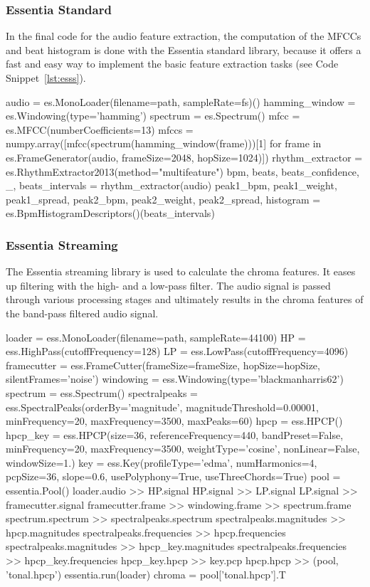 \subsubsection{Essentia Standard}

In the final code for the audio feature extraction, the computation of the MFCCs and beat histogram is done with the Essentia standard library, because it offers a fast and easy way to implement the basic feature extraction tasks (see Code Snippet~\ref{lst:esss}). 
\begin{pythonCode}[frame=single,label={lst:esss},caption={Essentia standard},captionpos=b]
audio = es.MonoLoader(filename=path, sampleRate=fs)()
hamming_window = es.Windowing(type='hamming')
spectrum = es.Spectrum()
mfcc = es.MFCC(numberCoefficients=13)
mfccs = numpy.array([mfcc(spectrum(hamming_window(frame)))[1] 
	for frame in es.FrameGenerator(audio, frameSize=2048, hopSize=1024)])
rhythm_extractor = es.RhythmExtractor2013(method="multifeature")
bpm, beats, beats_confidence, _, beats_intervals = rhythm_extractor(audio)
peak1_bpm, peak1_weight, peak1_spread, peak2_bpm, peak2_weight, peak2_spread, histogram =
	es.BpmHistogramDescriptors()(beats_intervals)
\end{pythonCode}

\subsubsection{Essentia Streaming}

The Essentia streaming library is used to calculate the chroma features. It eases up filtering with the high- and a low-pass filter. The audio signal is passed through various processing stages and ultimately results in the chroma features of the band-pass filtered audio signal. 
\begin{pythonCode}[frame=single,label={lst:essst},caption={Essentia streaming},captionpos=b]
loader = ess.MonoLoader(filename=path, sampleRate=44100)
HP = ess.HighPass(cutoffFrequency=128)
LP = ess.LowPass(cutoffFrequency=4096)
framecutter = ess.FrameCutter(frameSize=frameSize, hopSize=hopSize, silentFrames='noise')
windowing = ess.Windowing(type='blackmanharris62')
spectrum = ess.Spectrum()
spectralpeaks = ess.SpectralPeaks(orderBy='magnitude', magnitudeThreshold=0.00001, minFrequency=20, maxFrequency=3500, maxPeaks=60)
hpcp = ess.HPCP()
hpcp_key = ess.HPCP(size=36, referenceFrequency=440, bandPreset=False, minFrequency=20, maxFrequency=3500, weightType='cosine', nonLinear=False, windowSize=1.)
key = ess.Key(profileType='edma', numHarmonics=4, pcpSize=36, slope=0.6, usePolyphony=True, useThreeChords=True)
pool = essentia.Pool()
loader.audio >> HP.signal
HP.signal >> LP.signal
LP.signal >> framecutter.signal    
framecutter.frame >> windowing.frame >> spectrum.frame
spectrum.spectrum >> spectralpeaks.spectrum
spectralpeaks.magnitudes >> hpcp.magnitudes
spectralpeaks.frequencies >> hpcp.frequencies
spectralpeaks.magnitudes >> hpcp_key.magnitudes
spectralpeaks.frequencies >> hpcp_key.frequencies
hpcp_key.hpcp >> key.pcp
hpcp.hpcp >> (pool, 'tonal.hpcp')
essentia.run(loader)
chroma = pool['tonal.hpcp'].T
\end{pythonCode}	


